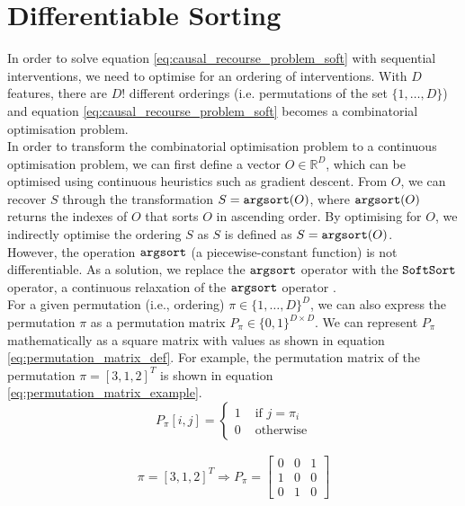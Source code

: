 \section{Differentiable Sorting}

In order to solve equation \ref{eq:causal_recourse_problem_soft} with sequential interventions, we need to optimise for an ordering of interventions. With $D$ features, there are $D!$ different orderings (i.e. permutations of the set $\{1, \ldots, D\}$) and equation \ref{eq:causal_recourse_problem_soft} becomes a combinatorial optimisation problem.\\

In order to transform the combinatorial optimisation problem to a continuous optimisation problem, we can first define a vector $O\in \mathbb{R}^{D}$, which can be optimised using continuous heuristics such as gradient descent. From $O$, we can recover $S$ through the transformation $S = \operatorname*{\texttt{argsort}}(O)$, where $\operatorname*{\texttt{argsort}}(O)$ returns the indexes of $O$ that sorts $O$ in ascending order. By optimising for $O$, we indirectly optimise the ordering $S$ as $S$ is defined as $S = \operatorname*{\texttt{argsort}}(O)$.\\

However, the operation $\operatorname*{\texttt{argsort}}$ (a piecewise-constant function) is not differentiable. As a solution, we replace the $\operatorname*{\texttt{argsort}}$ operator with the $\operatorname*{\texttt{SoftSort}}$ operator, a continuous relaxation of the $\operatorname*{\texttt{argsort}}$ operator \citep{prilloSoftSortContinuousRelaxation2020}.\\

For a given permutation (i.e., ordering) $\pi \in \{1, \ldots, D\}^D$, we can also express the permutation $\pi$ as a permutation matrix $P_{\pi} \in \{0,1\}^{D \times D}$. We can represent $P_{\pi}$ mathematically as a square matrix with values as shown in equation \ref{eq:permutation_matrix_def}. For example, the permutation matrix of the permutation $\pi = [3, 1, 2]^T$ is shown in equation \ref{eq:permutation_matrix_example}. \\

\begin{equation} \label{eq:permutation_matrix_def}
	P_{\pi}[i,j] = \begin{cases}
		1 & \text{ if } j = \pi_i \\
		0 & \text{ otherwise}
	\end{cases}
\end{equation}

\begin{align} \label{eq:permutation_matrix_example}
	\pi = [3, 1, 2]^T \Longrightarrow	P_{\pi} = 
	\left[\begin{array}{lllll}
		0 & 0 & 1 \\
		1 & 0 & 0 \\
		0 & 1 & 0
	\end{array}\right]
\end{align}

